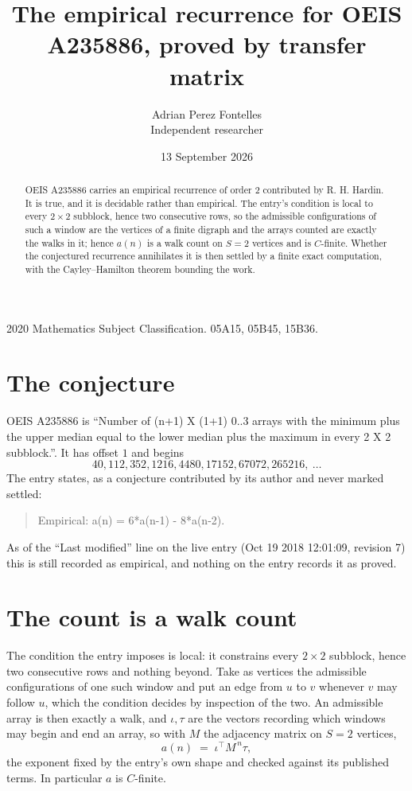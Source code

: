 \documentclass[11pt,a4paper]{article}
\title{The empirical recurrence for OEIS A235886, proved by transfer matrix}
\author{Adrian Perez Fontelles\\ \small Independent researcher}
\date{13 September 2026}
\theoremstyle{plain}
\theoremstyle{definition}
\begin{document}
\maketitle

\begin{abstract}
OEIS A235886 carries an empirical recurrence of order $2$ contributed by R. H. Hardin. It is
true, and it is decidable rather than empirical. The entry's condition is local to every $2\times2$ subblock, hence two consecutive rows, so
the admissible configurations of such a window are the vertices of a finite digraph and the
arrays counted are exactly the walks in it; hence $a(n)$ is a walk count on $S=2$ vertices
and is $C$-finite. Whether the conjectured recurrence annihilates it is then settled by a
finite exact computation, with the Cayley--Hamilton theorem bounding the work.
\end{abstract}

\noindent\small 2020 Mathematics Subject Classification. 05A15, 05B45, 15B36.\normalsize

\section{The conjecture}

OEIS A235886 is ``Number of (n+1) X (1+1) 0..3 arrays with the minimum plus the upper median equal to the lower median plus the maximum in every 2 X 2 subblock.''. It has offset $1$ and begins
\[
40, 112, 352, 1216, 4480, 17152, 67072, 265216,\ \dots
\]
The entry states, as a conjecture contributed by its author and never marked settled:
\begin{quote}
Empirical: a(n) = 6*a(n-1) - 8*a(n-2).
\end{quote}
As of the ``Last modified'' line on the live entry (Oct 19 2018 12:01:09, revision 7) this is still
recorded as empirical, and nothing on the entry records it as proved.

\section{The count is a walk count}

The condition the entry imposes is local: it constrains every $2\times2$ subblock, hence two consecutive rows and nothing beyond. Take as vertices the admissible configurations of one such window and put an edge from $u$ to $v$ whenever $v$ may follow $u$, which the condition decides by inspection of the two.
An admissible array is then exactly a walk, and $\iota,\tau$ are the vectors recording which windows may begin and end an array, so with $M$ the adjacency matrix on $S=2$ vertices,
\[
a(n)\;=\;\iota^{\!\top}M^{\,n}\tau ,
\]
the exponent fixed by the entry's own shape and checked against its published terms. In
particular $a$ is $C$-finite.
\end{document}
